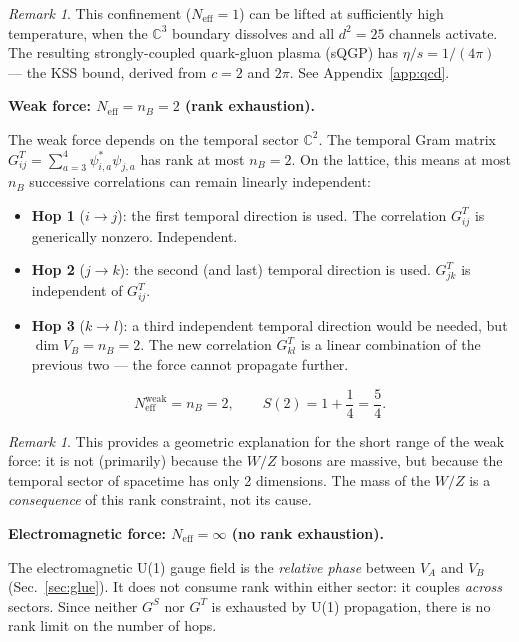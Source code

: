 \documentclass[12pt]{article}
\theoremstyle{remark}
\newtheorem{remark}[theorem]{Remark}
\theoremstyle{definition}
\begin{document}
\begin{remark}
This confinement ($N_\text{eff} = 1$) can be lifted at sufficiently high temperature, when the $\mathbb{C}^3$ boundary dissolves and all $d^2 = 25$ channels activate. The resulting strongly-coupled quark-gluon plasma (sQGP) has $\eta/s = 1/(4\pi)$ --- the KSS bound, derived from $c = 2$ and $2\pi$. See Appendix~\ref{app:qcd}.
\end{remark}

\bigskip

\noindent\textbf{Weak force: $N_\text{eff} = n_B = 2$ (rank exhaustion).}

The weak force depends on the temporal sector $\mathbb{C}^2$. The temporal Gram matrix $G^T_{ij} = \sum_{a=3}^{4}\psi^*_{i,a}\psi_{j,a}$ has rank at most $n_B = 2$. On the lattice, this means at most $n_B$ successive correlations can remain linearly independent:

\begin{itemize}
\item \textbf{Hop 1} ($i \to j$): the first temporal direction is used. The correlation $G^T_{ij}$ is generically nonzero. Independent.
\item \textbf{Hop 2} ($j \to k$): the second (and last) temporal direction is used. $G^T_{jk}$ is independent of $G^T_{ij}$.
\item \textbf{Hop 3} ($k \to l$): a third independent temporal direction would be needed, but $\dim V_B = n_B = 2$. The new correlation $G^T_{kl}$ is a linear combination of the previous two --- the force cannot propagate further.
\end{itemize}

\begin{equation}
N_\text{eff}^\text{weak} = n_B = 2, \qquad S(2) = 1 + \frac{1}{4} = \frac{5}{4}.
\end{equation}

\begin{remark}
This provides a geometric explanation for the short range of the weak force: it is not (primarily) because the $W/Z$ bosons are massive, but because the temporal sector of spacetime has only 2 dimensions. The mass of the $W/Z$ is a \emph{consequence} of this rank constraint, not its cause.
\end{remark}

\bigskip

\noindent\textbf{Electromagnetic force: $N_\text{eff} = \infty$ (no rank exhaustion).}

The electromagnetic U(1) gauge field is the \emph{relative phase} between $V_A$ and $V_B$ (Sec.~\ref{sec:glue}). It does not consume rank within either sector: it couples \emph{across} sectors. Since neither $G^S$ nor $G^T$ is exhausted by U(1) propagation, there is no rank limit on the number of hops.
\end{document}

